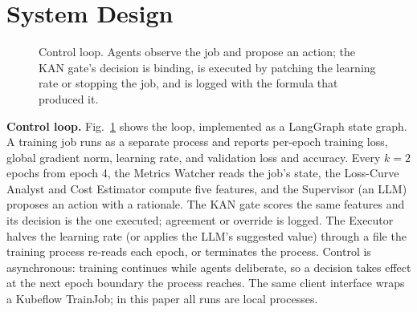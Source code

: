 \documentclass[conference]{IEEEtran}
\begin{document}
\section{System Design}
\begin{figure}[t]
\centering
{}
\caption{Control loop. Agents observe the job and propose an action; the KAN gate's decision is binding, is executed by patching the learning rate or stopping the job, and is logged with the formula that produced it.}
\label{fig:arch}
\end{figure}

\textbf{Control loop.} Fig.~\ref{fig:arch} shows the loop, implemented as a LangGraph state graph. A training job runs as a separate process and reports per-epoch training loss, global gradient norm, learning rate, and validation loss and accuracy. Every $k=2$ epochs from epoch 4, the Metrics Watcher reads the job's state, the Loss-Curve Analyst and Cost Estimator compute five features, and the Supervisor (an LLM) proposes an action with a rationale. The KAN gate scores the same features and its decision is the one executed; agreement or override is logged. The Executor halves the learning rate (or applies the LLM's suggested value) through a file the training process re-reads each epoch, or terminates the process. Control is asynchronous: training continues while agents deliberate, so a decision takes effect at the next epoch boundary the process reaches. The same client interface wraps a Kubeflow TrainJob; in this paper all runs are local processes.
\end{document}
